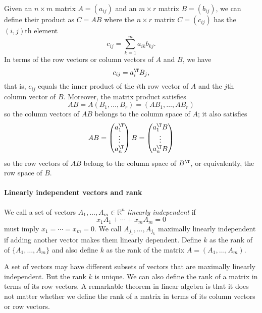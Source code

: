 Given an $n\times m$ matrix $A = (a_{ij})$ and an $m\times r$ matrix $B = (b_{ij})$, we can define their product as $C = AB$ where the $n\times r$ matrix $C = (c_{ij})$ has the $(i, j)$th element
$$
c_{ij} = \sum_{k=1}^m a_{ik} b_{kj} .
$$
In terms of the row vectors or column vectors of $A$ and $B$, we have
$$
c_{ij} = a_i^{\T} B_j ,
$$
that is, $c_{ij}$ equals the inner product of the $i$th row vector of $A$ and the $j$th column vector of $B$. Moreover, the matrix product satisfies 
\begin{equation}\label{eq::matrix-product-1}
AB = A (B_1, \ldots, B_r) = (AB_1, \ldots, AB_r)
\end{equation}
so the column vectors of $AB$ belongs to the column space of $A$; it also satisfies 
\begin{equation}\label{eq::matrix-product-2}
AB = \begin{pmatrix}
a_1^{\T} \\
\vdots \\
a_n^{\T}
\end{pmatrix} B
= \begin{pmatrix}
a_1^{\T} B \\
\vdots \\
a_n^{\T} B
\end{pmatrix}
\end{equation}
so the row vectors of $AB$ belong to the column space of $B^{\T}$, or equivalently, the row space of $B$. 


\paragraph{Linearly independent vectors and rank}

We call a set of vectors $A_1, \ldots, A_m \in \mathbb{R}^{n}$ {\it linearly independent} if 
$$
x_1 A_1 + \cdots + x_m A_m = 0 
$$
must imply $x_1= \cdots = x_m = 0$. 
We call $A_{j_1}, \ldots, A_{j_k}$ maximally linearly independent if adding another vector makes them linearly dependent. Define $k$ as the rank of of $\{A_1, \ldots, A_m\}$ and also define $k$ as the rank of the matrix $A = (A_1, \ldots, A_m)$. 


A set of vectors may have different subsets of vectors that are maximally linearly independent. But the rank $k$ is unique. We can also define the rank of a matrix in terms of its row vectors. A remarkable theorem in linear algebra is that it does not matter whether we define the rank of a matrix in terms of its column vectors or row vectors. 


